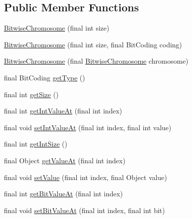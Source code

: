 \subsection*{Public Member Functions}
\begin{DoxyCompactItemize}
\item 
\hyperlink{classjenes_1_1chromosome_1_1_bitwise_chromosome_a87547c87419943bded51820cbc1ae830}{Bitwise\-Chromosome} (final int size)
\item 
\hyperlink{classjenes_1_1chromosome_1_1_bitwise_chromosome_a9109a8205e447db9032f29494f0d9b3d}{Bitwise\-Chromosome} (final int size, final Bit\-Coding coding)
\item 
\hyperlink{classjenes_1_1chromosome_1_1_bitwise_chromosome_a90798d86b6c1871c441b562e0b1d50ca}{Bitwise\-Chromosome} (final \hyperlink{classjenes_1_1chromosome_1_1_bitwise_chromosome}{Bitwise\-Chromosome} chromosome)
\item 
final Bit\-Coding \hyperlink{classjenes_1_1chromosome_1_1_bitwise_chromosome_a905b92cd6dc14db9d2b9276f1a6686e9}{get\-Type} ()
\item 
final int \hyperlink{classjenes_1_1chromosome_1_1_bitwise_chromosome_ae59ae8f495ec9d5aa15712cee7c0b313}{get\-Size} ()
\item 
final int \hyperlink{classjenes_1_1chromosome_1_1_bitwise_chromosome_af817cb2110fc6b8d415e46377ddd4911}{get\-Int\-Value\-At} (final int index)
\item 
final void \hyperlink{classjenes_1_1chromosome_1_1_bitwise_chromosome_a3cbcf428333a0dc4209ce2c820054542}{set\-Int\-Value\-At} (final int index, final int value)
\item 
final int \hyperlink{classjenes_1_1chromosome_1_1_bitwise_chromosome_a36e6b8c849d563a359245763116667d5}{get\-Int\-Size} ()
\item 
final Object \hyperlink{classjenes_1_1chromosome_1_1_bitwise_chromosome_a3061d34e1f0c0faa915d4da7ea2f615c}{get\-Value\-At} (final int index)
\item 
final void \hyperlink{classjenes_1_1chromosome_1_1_bitwise_chromosome_aaa42be8f0c26735e8a8d603d9b743b6a}{set\-Value} (final int index, final Object value)
\item 
final int \hyperlink{classjenes_1_1chromosome_1_1_bitwise_chromosome_a05ce80f3729d007c5d550eef5969ac86}{get\-Bit\-Value\-At} (final int index)
\item 
final void \hyperlink{classjenes_1_1chromosome_1_1_bitwise_chromosome_a2e746b511933914d4be452573ac5ab7c}{set\-Bit\-Value\-At} (final int index, final int bit)

\end{DoxyCompactItemize}
